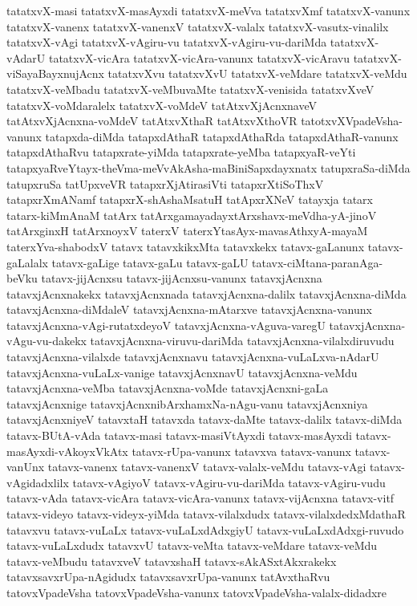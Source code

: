 {tatatxvX-masi
tatatxvX-masAyxdi
tatatxvX-meVva
tatatxvXmf
tatatxvX-vanunx
tatatxvX-vanenx
tatatxvX-vanenxV
tatatxvX-valalx
tatatxvX-vasutx-vinalilx
tatatxvX-vAgi
tatatxvX-vAgiru-vu
tatatxvX-vAgiru-vu-dariMda
tatatxvX-vAdarU
tatatxvX-vicAra
tatatxvX-vicAra-vanunx
tatatxvX-vicAravu
tatatxvX-viSayaBayxnujAcnx
tatatxvXvu
tatatxvXvU
tatatxvX-veMdare
tatatxvX-veMdu
tatatxvX-veMbadu
tatatxvX-veMbuvaMte
tatatxvX-venisida
tatatxvXveV
tatatxvX-voMdaralelx
tatatxvX-voMdeV
tatAtxvXjAcnxnaveV
tatAtxvXjAcnxna-voMdeV
tatAtxvXthaR
tatAtxvXthoVR
tatotxvXVpadeVsha-vanunx
tatapxda-diMda
tatapxdAthaR
tatapxdAthaRda
tatapxdAthaR-vanunx
tatapxdAthaRvu
tatapxrate-yiMda
tatapxrate-yeMba
tatapxyaR-veYti
tatapxyaRveYtayx-theVma-meVvAkAsha-maBiniSapxdayxnatx
tatupxraSa-diMda
tatupxruSa
tatUpxveVR
tatapxrXjAtirasiVti
tatapxrXtiSoThxV
tatapxrXmANamf
tatapxrX-shAshaMsatuH
tatApxrXNeV
tatayxja
tatarx
tatarx-kiMmAnaM
tatArx
tatArxgamayadayxtArxshavx-meVdha-yA-jinoV
tatArxginxH
tatArxnoyxV
taterxV
taterxYtasAyx-mavasAthxyA-mayaM
taterxYva-shabodxV
tatavx
tatavxkikxMta
tatavxkekx
tatavx-gaLanunx
tatavx-gaLalalx
tatavx-gaLige
tatavx-gaLu
tatavx-gaLU
tatavx-ciMtana-paranAga-beVku
tatavx-jijAcnxsu
tatavx-jijAcnxsu-vanunx
tatavxjAcnxna
tatavxjAcnxnakekx
tatavxjAcnxnada
tatavxjAcnxna-dalilx
tatavxjAcnxna-diMda
tatavxjAcnxna-diMdaleV
tatavxjAcnxna-mAtarxve
tatavxjAcnxna-vanunx
tatavxjAcnxna-vAgi-rutatxdeyoV
tatavxjAcnxna-vAguva-varegU
tatavxjAcnxna-vAgu-vu-dakekx
tatavxjAcnxna-viruvu-dariMda
tatavxjAcnxna-vilalxdiruvudu
tatavxjAcnxna-vilalxde
tatavxjAcnxnavu
tatavxjAcnxna-vuLaLxva-nAdarU
tatavxjAcnxna-vuLaLx-vanige
tatavxjAcnxnavU
tatavxjAcnxna-veMdu
tatavxjAcnxna-veMba
tatavxjAcnxna-voMde
tatavxjAcnxni-gaLa
tatavxjAcnxnige
tatavxjAcnxnibArxhamxNa-nAgu-vanu
tatavxjAcnxniya
tatavxjAcnxniyeV
tatavxtaH
tatavxda
tatavx-daMte
tatavx-dalilx
tatavx-diMda
tatavx-BUtA-vAda
tatavx-masi
tatavx-masiVtAyxdi
tatavx-masAyxdi
tatavx-masAyxdi-vAkoyxVkAtx
tatavx-rUpa-vanunx
tatavxva
tatavx-vanunx
tatavx-vanUnx
tatavx-vanenx
tatavx-vanenxV
tatavx-valalx-veMdu
tatavx-vAgi
tatavx-vAgidadxlilx
tatavx-vAgiyoV
tatavx-vAgiru-vu-dariMda
tatavx-vAgiru-vudu
tatavx-vAda
tatavx-vicAra
tatavx-vicAra-vanunx
tatavx-vijAcnxna
tatavx-vitf
tatavx-videyo
tatavx-videyx-yiMda
tatavx-vilalxdudx
tatavx-vilalxdedxMdathaR
tatavxvu
tatavx-vuLaLx
tatavx-vuLaLxdAdxgiyU
tatavx-vuLaLxdAdxgi-ruvudo
tatavx-vuLaLxdudx
tatavxvU
tatavx-veMta
tatavx-veMdare
tatavx-veMdu
tatavx-veMbudu
tatavxveV
tatavxshaH
tatavx-sAkASxtAkxrakekx
tatavxsavxrUpa-nAgidudx
tatavxsavxrUpa-vanunx
tatAvxthaRvu
tatovxVpadeVsha
tatovxVpadeVsha-vanunx
tatovxVpadeVsha-valalx-didadxre
}
